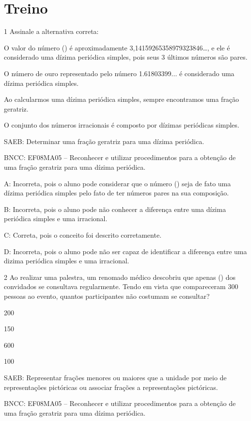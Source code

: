 \section{Treino}

\num{1} Assinale a alternativa correta:
\item O valor do número (\pi) é aproximadamente
3,14159265358979323846\ldots, e ele é considerado uma dízima periódica
simples, pois seus 3 últimos números são pares.
\item O número de ouro representado pelo número 1.61803399... é considerado
uma dízima periódica simples.
\item Ao calcularmos uma dízima periódica simples, sempre encontramos uma
fração geratriz.
\item O conjunto dos números irracionais é composto por dízimas periódicas
simples.

SAEB: Determinar uma fração geratriz para uma dízima periódica.

BNCC: EF08MA05 -- Reconhecer e utilizar procedimentos para a obtenção de
uma fração geratriz para uma dízima periódica.

A: Incorreta, pois o aluno pode considerar que o número (\pi) seja de
fato uma dízima periódica simples pelo fato de ter números pares na sua
composição.

B: Incorreta, pois o aluno pode não conhecer a diferença entre uma
dízima periódica simples e uma irracional.

C: Correta, pois o conceito foi descrito corretamente.

D: Incorreta, pois o aluno pode não ser capaz de identificar a diferença
entre uma dizima periódica simples e uma irracional.

\num{2} Ao realizar uma palestra, um renomado médico descobriu que apenas
() dos convidados se consultava regularmente. Tendo em
vista que compareceram 300 pessoas ao evento, quantos participantes não
costumam se consultar?
\item 200
\item 150
\item 600
\item 100

SAEB: Representar frações menores ou maiores que a unidade por meio de
representações pictóricas ou associar frações a representações
pictóricas.

BNCC: EF08MA05 -- Reconhecer e utilizar procedimentos para a obtenção de
uma fração geratriz para uma dízima periódica.


